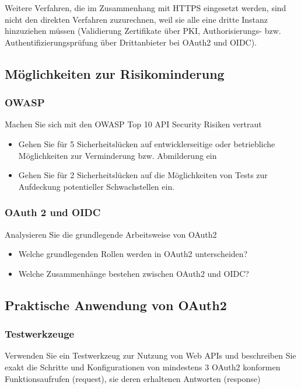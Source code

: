 \documentclass[notitlepage, hidelinks]{article}
\begin{document}
Weitere Verfahren, die im Zusammenhang mit HTTPS eingesetzt werden, sind nicht den direkten Verfahren zuzurechnen, weil sie alle eine dritte Instanz hinzuziehen müssen (Validierung Zertifikate über PKI, Authorisierungs- bzw. Authentifizierungsprüfung über Drittanbieter bei OAuth2 und OIDC).



\subsection{Möglichkeiten zur Risikominderung}
\subsubsection{OWASP}
Machen Sie sich mit den OWASP Top 10 API Security Risiken vertraut
\begin{itemize}
\item Gehen Sie für 5 Sicherheitslücken auf entwicklerseitige oder betriebliche Möglichkeiten zur Verminderung bzw. Abmilderung ein
\item Gehen Sie für 2 Sicherheitslücken auf die Möglichkeiten von Tests zur Aufdeckung potentieller Schwachstellen ein.
\end{itemize}

\subsubsection{OAuth 2 und OIDC}
Analysieren Sie die grundlegende Arbeitsweise von OAuth2
\begin{itemize}
\item Welche grundlegenden Rollen werden in OAuth2 unterscheiden?
\item Welche Zusammenhänge bestehen zwischen OAuth2 und OIDC?
\end{itemize}

\subsection{Praktische Anwendung von OAuth2}
\subsubsection{Testwerkzeuge}
Verwenden Sie ein Testwerkzeug zur Nutzung von Web APIs und beschreiben Sie exakt die Schritte und Konfigurationen von mindestens 3 OAuth2 konformen Funktionsaufrufen (request), sie deren erhaltenen Antworten (response)
\end{document}
